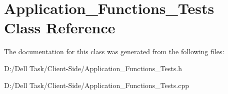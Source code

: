 \hypertarget{class_application___functions___tests}{}\section{Application\+\_\+\+Functions\+\_\+\+Tests Class Reference}
\label{class_application___functions___tests}


The documentation for this class was generated from the following files\+:\begin{DoxyCompactItemize}
\item 
D\+:/\+Dell Task/\+Client-\/\+Side/Application\+\_\+\+Functions\+\_\+\+Tests.\+h\item 
D\+:/\+Dell Task/\+Client-\/\+Side/Application\+\_\+\+Functions\+\_\+\+Tests.\+cpp\end{DoxyCompactItemize}
